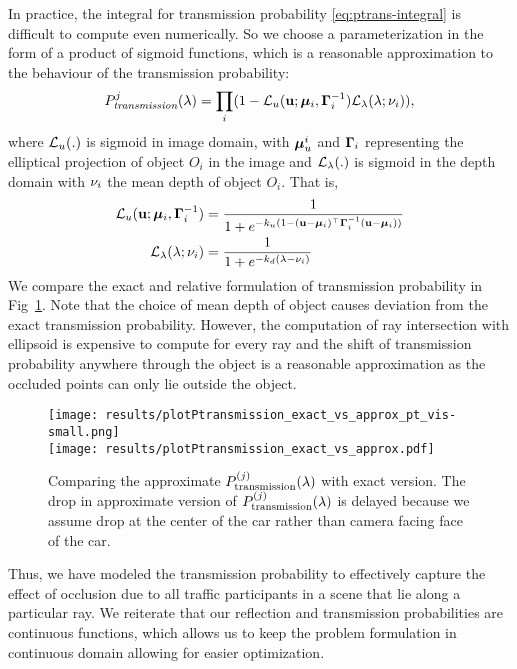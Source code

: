 In practice, the integral for transmission probability \eqref{eq:ptrans-integral} is difficult to compute even numerically. So we choose a parameterization in the form of a product of sigmoid functions, which is a reasonable approximation to the behaviour of the transmission probability:
%
\newcommand{\Ptransmission}{P_{\textit{transmission}}}%
\begin{align}
  \Ptransmission^j(\lambda) = \prod_i (1 - \cL_u (\bu; \bmu_i, \bGamma_i^{-1}) \cL_{\lambda}(\lambda; \meandepth{i})),
\label{eq:evalCumulativePtrans}
\end{align}
%
where $\mathcal{L}_u(.)$ is sigmoid in image domain, with ${\bm{\mu}}^i_u$ and $\bm{\Gamma}_i$ representing the elliptical projection of object $O_i$ in the image and $\mathcal{L}_{\lambda}(.)$ is sigmoid in the depth domain with $\nu_i$ the mean depth of object $O_i$. That is,
%
\begin{align}
\mathcal{L}_u(\mathbf{u}; {\bm{\mu}}_i, \bm{\Gamma}_i^{-1}) &= \frac{1}{1 + e^{-k_u(1 - (\mathbf{u} - {\bm{\mu}}_i)^\top \bm{\Gamma}_i^{-1} (\mathbf{u} - {\bm{\mu}}_i))}} \\
  \mathcal{L}_{\lambda}(\lambda; \nu_i) &= \frac{1}{1 + e^{-k_d(\lambda - \nu_i)}}
\end{align}
%
We compare the exact and relative formulation of transmission probability in
Fig~\ref{fig:compare:exact:approx:ptrans}. Note that the choice of mean depth
of object causes deviation from the exact transmission probability. However,
the computation of ray intersection with ellipsoid is expensive to compute for 
every ray and the shift of transmission probability anywhere through the object 
is a reasonable approximation as the occluded points can only lie outside the
object.

\begin{figure}
  \texttt{[image: results/plotPtransmission\_exact\_vs\_approx\_pt\_vis-small.png]}\\
  \texttt{[image: results/plotPtransmission\_exact\_vs\_approx.pdf]}
  \caption{Comparing the approximate $P^{(j)}_{\text{transmission}}(\lambda)$ with exact version. The drop in approximate version of $P^{(j)}_{\text{transmission}}(\lambda)$ is delayed because we assume drop at the center of the car rather than camera facing face of the car.}
  \label{fig:compare:exact:approx:ptrans}
\end{figure}

Thus, we have modeled the transmission probability to effectively capture the
effect of occlusion due to all traffic participants in a scene that lie along a
particular ray. We reiterate that our reflection and transmission probabilities
are continuous functions, which allows us to keep the problem formulation in
continuous domain allowing for easier optimization.
